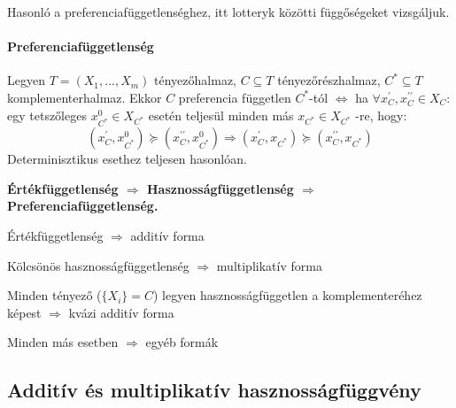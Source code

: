 \documentclass[a4paper,12pt]{article}
\begin{document}
Hasonló a preferenciafüggetlenséghez, itt lotteryk közötti függőségeket vizsgáljuk.

\paragraph{Preferenciafüggetlenség}

Legyen $T=(X_1,...,X_m)$ tényezőhalmaz, $C \subseteq T$ tényezőrészhalmaz,  $C^* \subseteq T $ komplementerhalmaz. Ekkor $C$ preferencia független $C^*$-tól $\Leftrightarrow$ ha $\forall x_C^{\prime}, x_C^{\prime\prime} \in X_C:$  egy tetszőleges $x_{C^{*}}^0 \in X_{C^*}$  esetén teljesül minden más $ x_{C^{*}} \in X_{C^*}$ -re, hogy:
\begin{equation}
(x_C^{\prime}, x_{C^{*}}^0) \succeq (x_C^{\prime\prime}, x_{C^{*}}^0) 
\Rightarrow
(x_C^{\prime}, x_{C^{*}}) \succeq (x_C^{\prime\prime}, x_{C^{*}}) 
\end{equation}
Determinisztikus esethez teljesen hasonlóan.

\textbf{Értékfüggetlenség $\Rightarrow$ Hasznosságfüggetlenség $\Rightarrow$ Preferenciafüggetlenség.}

Értékfüggetlenség $\Rightarrow$ additív forma

Kölcsönös hasznosságfüggetlenség  $\Rightarrow$ multiplikatív forma

Minden tényező ($\{X_i\} = C$) legyen hasznosságfüggetlen a komplementeréhez képest $\Rightarrow$ kvázi additív forma

Minden más esetben  $\Rightarrow$ egyéb formák

\subsection{Additív és multiplikatív hasznosságfüggvény}
\end{document}
